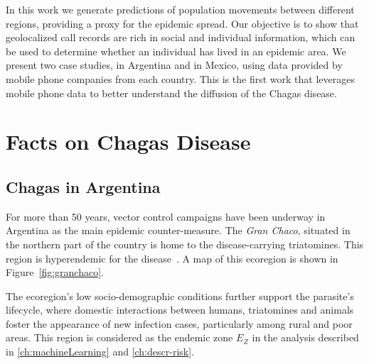  In this work we generate predictions of population movements between different regions, providing a proxy for the epidemic spread. Our objective is to show that geolocalized call records are rich in social and individual information, which can be used to determine whether an individual has lived in an epidemic area. We present two case studies, in Argentina and in Mexico, using data provided by mobile phone companies from each country. %
This is the first work that leverages mobile phone data to better understand the diffusion of the Chagas disease.




\section{Facts on Chagas Disease}

\subsection{Chagas in  Argentina}\label{endemic_zone_argentina}

For more than 50 years, vector control campaigns have been underway in Argentina as the main epidemic counter-measure. The \textit{Gran Chaco}, situated in the northern part of the country is home to the disease-carrying triatomines. This region is hyperendemic for the disease~\cite{OPS2014mapa}. A map of this ecoregion is shown in Figure~\cref{fig:granchaco}.

The ecoregion's low socio-demographic conditions further support the parasite's lifecycle, where domestic interactions between humans, triatomines and animals foster the appearance of new infection cases, particularly among rural and poor areas.
This region is considered as the endemic zone $E_Z$ in the analysis described in \cref{ch:machineLearning} and \cref{ch:descr-risk}.


